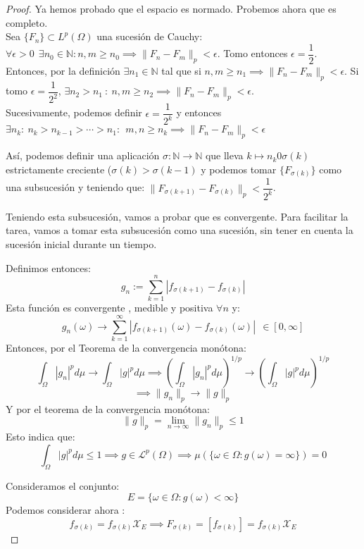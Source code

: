 \begin{proof}
  Ya hemos probado que el espacio es normado. Probemos ahora que es completo.\\

  Sea $\{ F_n\} \subset L^p(\Omega)$ una sucesión de Cauchy: $\forall \epsilon > 0 \ \ \exists n_0 \in \mathbb N : n,m \geq n_0 \implies \| F_n - F_m \|_p < \epsilon$.
  Tomo entonces $\epsilon = \dfrac{1}{2}$. Entonces, por la definición $\exists n_1 \in \mathbb N$ tal que si $n,m \geq n_1 \implies \| F_n - F_m \|_p < \epsilon $.
  Si tomo $\epsilon = \dfrac{1}{2^2}$, $\exists n_2 > n_1 \ : \ n,m \geq n_2 \implies \| F_n - F_m \|_p < \epsilon$.\\
  Sucesivamente, podemos definir $\epsilon= \dfrac{1}{2^k}$ y entonces $\exists n_k : \ n_k > n_{k-1} > \cdots > n_1 : \ \ m,n \geq n_k \implies \| F_n - F_m \|_p < \epsilon$

  Así, podemos definir una aplicación $\sigma: \mathbb N \to \mathbb N$ que lleva $k \mapsto n_k 0 \sigma(k)$ estrictamente creciente ($\sigma(k) > \sigma(k-1)$ y podemos tomar $\{F_{\sigma(k)}\}$ como una subsucesión y teniendo que: $\| F_{\sigma(k+1)} - F_{\sigma(k)} \|_p < \dfrac{1}{2^k}$.

  Teniendo esta subsucesión, vamos a probar que es convergente. Para facilitar la tarea, vamos a tomar esta subsucesión como una sucesión, sin tener en cuenta la sucesión inicial durante un tiempo.

  Definimos entonces:
  \[
    g_n := \sum_{k=1}^n |f_{\sigma(k+1)} - f_{\sigma(k)}|
  \]
  Esta función es convergente , medible y positiva $\forall n$ y:
  \[
    g_n(\omega) \to \sum_{k=1}^\infty |f_{\sigma(k+1)}(\omega) - f_{\sigma(k)}(\omega)| \ \ \in [0,\infty]
  \]
  Entonces, por el Teorema de la convergencia monótona:
  \[
    \int_\Omega |g_n|^p d\mu \to \int_\Omega |g|^p d\mu \implies (\int_\Omega |g_n|^p d\mu)^{1/p} \to (\int_\Omega |g|^p d\mu)^{1/p}
  \]
  \[
    \implies \|g_n\|_p \to \|g\|_p
  \]
  Y por el teorema de la convergencia monótona:
  \[
    \|g\|_p = \lim_{n\to \infty} \|g_n\|_p \leq 1
  \]
  Esto indica que:
  \[
    \int_\Omega |g|^p d\mu \leq 1 \implies g \in \mathcal L ^p(\Omega) \implies \mu(\{ \omega \in \Omega : g(\omega) = \infty\}) = 0
  \]

  Consideramos el conjunto:
  \[
    E = \{ \omega \in \Omega : g(\omega) < \infty\}
  \]
  Podemos considerar ahora :
  \[
    f_{\sigma(k)} = f_{\sigma(k)} \mathcal X _E \implies F_{\sigma(k)} = [f_{\sigma(k)}] = f_{\sigma(k)} \mathcal X _E
  \]


\end{proof}
